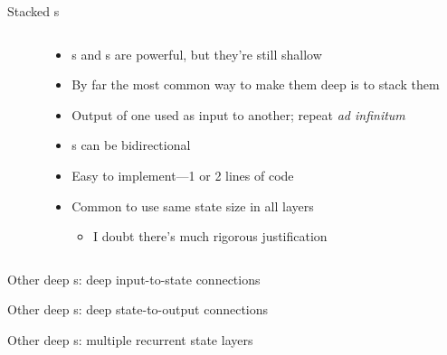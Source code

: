 \begin{frame}{Stacked \rnn{}s}
    \begin{columns}
        \begin{column}{0.41\textwidth}
            
        \end{column}
        \begin{column}{0.59\textwidth}
            \begin{itemize}
                \item \lstm{}s and \gru{}s are powerful, but they're still shallow
                \item By far the most common way to make them deep is to \alert{stack} them
                \item Output of one \rnn{} used as input to another; repeat \emph{ad infinitum}
                \pause
                \item \rnn{}s can be bidirectional
                \item Easy to implement---1 or 2 lines of code
                \item Common to use same state size in all layers
                \begin{itemize}
                    \item I doubt there's much rigorous justification
                \end{itemize}
            \end{itemize}
        \end{column}
    \end{columns}
\end{frame}

\begin{frame}{Other deep \rnn{}s: deep input-to-state connections}
    \hspace{2cm}
    
    
\end{frame}

\begin{frame}{Other deep \rnn{}s: deep state-to-output connections}
    \hspace{2cm}
    
    
\end{frame}

\begin{frame}{Other deep \rnn{}s: multiple recurrent state layers \citep{GravesICASSP13}}
    \hspace{2cm}
    
    
\end{frame}

